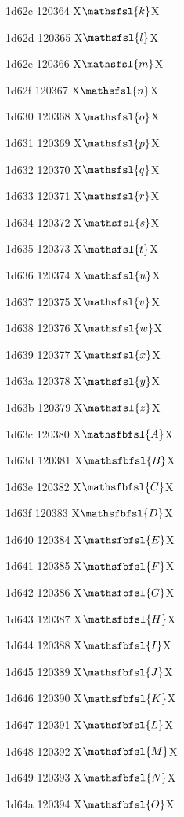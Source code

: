\documentclass[11pt]{article}
\begin{document}
1d62c 120364 X{\ensuremath{\mathsfsl{k}}}X

1d62d 120365 X{\ensuremath{\mathsfsl{l}}}X

1d62e 120366 X{\ensuremath{\mathsfsl{m}}}X

1d62f 120367 X{\ensuremath{\mathsfsl{n}}}X

1d630 120368 X{\ensuremath{\mathsfsl{o}}}X

1d631 120369 X{\ensuremath{\mathsfsl{p}}}X

1d632 120370 X{\ensuremath{\mathsfsl{q}}}X

1d633 120371 X{\ensuremath{\mathsfsl{r}}}X

1d634 120372 X{\ensuremath{\mathsfsl{s}}}X

1d635 120373 X{\ensuremath{\mathsfsl{t}}}X

1d636 120374 X{\ensuremath{\mathsfsl{u}}}X

1d637 120375 X{\ensuremath{\mathsfsl{v}}}X

1d638 120376 X{\ensuremath{\mathsfsl{w}}}X

1d639 120377 X{\ensuremath{\mathsfsl{x}}}X

1d63a 120378 X{\ensuremath{\mathsfsl{y}}}X

1d63b 120379 X{\ensuremath{\mathsfsl{z}}}X

1d63c 120380 X{\ensuremath{\mathsfbfsl{A}}}X

1d63d 120381 X{\ensuremath{\mathsfbfsl{B}}}X

1d63e 120382 X{\ensuremath{\mathsfbfsl{C}}}X

1d63f 120383 X{\ensuremath{\mathsfbfsl{D}}}X

1d640 120384 X{\ensuremath{\mathsfbfsl{E}}}X

1d641 120385 X{\ensuremath{\mathsfbfsl{F}}}X

1d642 120386 X{\ensuremath{\mathsfbfsl{G}}}X

1d643 120387 X{\ensuremath{\mathsfbfsl{H}}}X

1d644 120388 X{\ensuremath{\mathsfbfsl{I}}}X

1d645 120389 X{\ensuremath{\mathsfbfsl{J}}}X

1d646 120390 X{\ensuremath{\mathsfbfsl{K}}}X

1d647 120391 X{\ensuremath{\mathsfbfsl{L}}}X

1d648 120392 X{\ensuremath{\mathsfbfsl{M}}}X

1d649 120393 X{\ensuremath{\mathsfbfsl{N}}}X

1d64a 120394 X{\ensuremath{\mathsfbfsl{O}}}X
\end{document}
